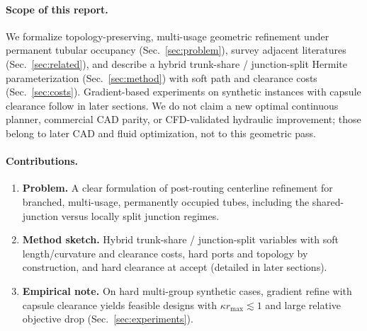 \paragraph{Scope of this report.}
We formalize topology-preserving, multi-usage geometric refinement
under permanent tubular occupancy (Sec.~\ref{sec:problem}), survey adjacent
literatures (Sec.~\ref{sec:related}), and describe a hybrid trunk-share /
junction-split Hermite parameterization (Sec.~\ref{sec:method}) with soft path
and clearance costs (Sec.~\ref{sec:costs}).
Gradient-based experiments on synthetic instances with capsule clearance follow
in later sections.
We do not claim a new optimal continuous planner, commercial CAD parity, or
CFD-validated hydraulic improvement; those belong to later CAD and fluid
optimization, not to this geometric pass.

\paragraph{Contributions.}
\begin{enumerate}
  \item \textbf{Problem.} A clear formulation of post-routing centerline
        refinement for branched, multi-usage, permanently occupied tubes,
        including the shared-junction versus locally split junction regimes.
  \item \textbf{Method sketch.} Hybrid trunk-share / junction-split variables
        with soft length/curvature and clearance costs, hard ports and
        topology by construction, and hard clearance at accept
        (detailed in later sections).
  \item \textbf{Empirical note.} On hard multi-group synthetic cases, gradient
        refine with capsule clearance yields feasible designs with
        $\kappa r_{\max}\lesssim 1$ and large relative objective drop
        (Sec.~\ref{sec:experiments}).
\end{enumerate}
